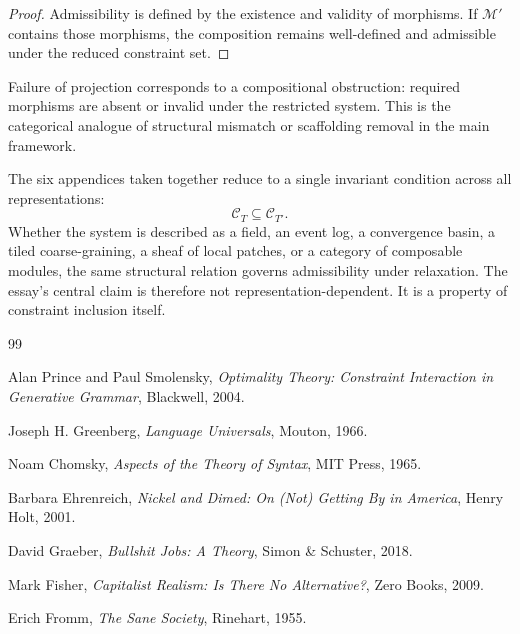 \documentclass[12pt, a4paper]{article}
\begin{document}
\begin{proof}
Admissibility is defined by the existence and validity of morphisms. If $\mathcal{M}'$ contains those morphisms, the composition remains well-defined and admissible under the reduced constraint set.
\end{proof}

Failure of projection corresponds to a compositional obstruction: required morphisms are absent or invalid under the restricted system. This is the categorical analogue of structural mismatch or scaffolding removal in the main framework.

The six appendices taken together reduce to a single invariant condition across all representations:
\[
\mathcal{C}_T \subseteq \mathcal{C}_{T'}.
\]
Whether the system is described as a field, an event log, a convergence basin, a tiled coarse-graining, a sheaf of local patches, or a category of composable modules, the same structural relation governs admissibility under relaxation. The essay's central claim is therefore not representation-dependent. It is a property of constraint inclusion itself.

\newpage

\begin{thebibliography}{99}

Alan Prince and Paul Smolensky,
\textit{Optimality Theory: Constraint Interaction in Generative Grammar},
Blackwell, 2004.

Joseph H. Greenberg,
\textit{Language Universals},
Mouton, 1966.

Noam Chomsky,
\textit{Aspects of the Theory of Syntax},
MIT Press, 1965.

Barbara Ehrenreich,
\textit{Nickel and Dimed: On (Not) Getting By in America},
Henry Holt, 2001.

David Graeber,
\textit{Bullshit Jobs: A Theory},
Simon \& Schuster, 2018.

Mark Fisher,
\textit{Capitalist Realism: Is There No Alternative?},
Zero Books, 2009.

Erich Fromm,
\textit{The Sane Society},
Rinehart, 1955.

\end{thebibliography}
\end{document}
